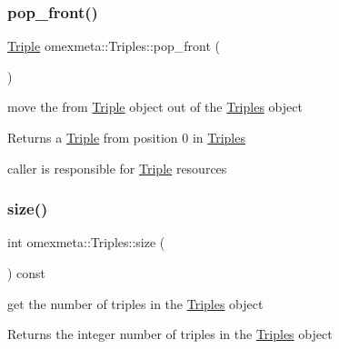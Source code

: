 \subsubsection{\texorpdfstring{pop\+\_\+front()}{pop\_front()}}
{\footnotesize\ttfamily \hyperlink{classomexmeta_1_1Triple}{Triple} omexmeta\+::\+Triples\+::pop\+\_\+front (\begin{DoxyParamCaption}{ }\end{DoxyParamCaption})}



move the from \hyperlink{classomexmeta_1_1Triple}{Triple} object out of the \hyperlink{classomexmeta_1_1Triples}{Triples} object 

\begin{DoxyReturn}{Returns}
a \hyperlink{classomexmeta_1_1Triple}{Triple} from position 0 in \hyperlink{classomexmeta_1_1Triples}{Triples}
\end{DoxyReturn}
caller is responsible for \hyperlink{classomexmeta_1_1Triple}{Triple} resources \mbox{\label{classomexmeta_1_1Triples_adc86427b3563d04849336a8da7566451}} 
\subsubsection{\texorpdfstring{size()}{size()}}
{\footnotesize\ttfamily int omexmeta\+::\+Triples\+::size (\begin{DoxyParamCaption}{ }\end{DoxyParamCaption}) const}



get the number of triples in the \hyperlink{classomexmeta_1_1Triples}{Triples} object 

\begin{DoxyReturn}{Returns}
the integer number of triples in the \hyperlink{classomexmeta_1_1Triples}{Triples} object 
\end{DoxyReturn}
\mbox{\label{classomexmeta_1_1Triples_ad2510c5b335b0266b05507c53bcc64af}} 
